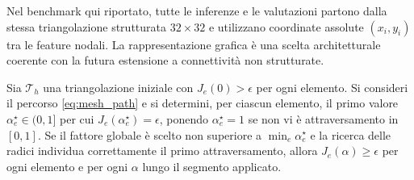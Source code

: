 Nel benchmark qui riportato, tutte le inferenze e le valutazioni partono dalla stessa triangolazione strutturata $32\times32$ e utilizzano coordinate assolute $(x_i,y_i)$ tra le feature nodali. La rappresentazione grafica è una scelta architetturale coerente con la futura estensione a connettività non strutturate.

\begin{proposition}
Sia $\mathcal T_h$ una triangolazione iniziale con $J_e(0)>\epsilon$ per ogni elemento. Si consideri il percorso \eqref{eq:mesh_path} e si determini, per ciascun elemento, il primo valore $\alpha_e^\star\in(0,1]$ per cui $J_e(\alpha_e^\star)=\epsilon$, ponendo $\alpha_e^\star=1$ se non vi è attraversamento in $[0,1]$. Se il fattore globale è scelto non superiore a $\min_e\alpha_e^\star$ e la ricerca delle radici individua correttamente il primo attraversamento, allora $J_e(\alpha)\geq\epsilon$ per ogni elemento e per ogni $\alpha$ lungo il segmento applicato.
\end{proposition}
